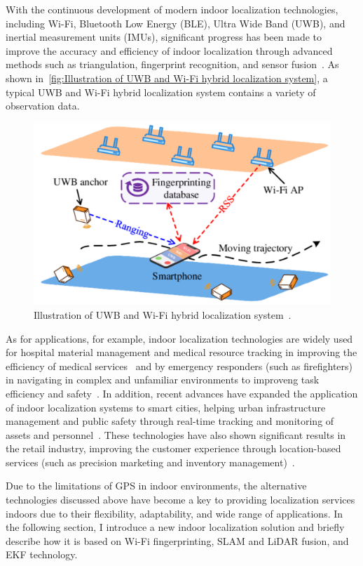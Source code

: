 \documentclass[12pt,a4paper]{article}
\numberwithin{equation}{section}
\begin{document}
With the continuous development of modern indoor localization technologies,
including Wi-Fi, Bluetooth Low Energy (BLE), Ultra Wide Band (UWB), and inertial
measurement units (IMUs), significant progress has been made to improve the
accuracy and efficiency of indoor localization through advanced methods such as
triangulation, fingerprint recognition, and sensor
fusion~\cite{guo2019survey}. As shown in~\autoref{fig:Illustration of UWB and
  Wi-Fi hybrid localization system}, a typical UWB and Wi-Fi hybrid localization
system contains a variety of observation data.
\begin{figure}[H]
  \centering
  \includegraphics[width=0.8\linewidth]{images/intro.png}
  \caption{Illustration of UWB and Wi-Fi hybrid localization
    system~\cite{article}.}
  \label{fig:Illustration of UWB and Wi-Fi hybrid localization system}
\end{figure}

As for applications, for example, indoor localization technologies are widely
used for hospital material management and medical resource tracking in improving
the efficiency of medical services~\cite{HOSSAIN20151} and by emergency
responders (such as firefighters) in navigating in complex and unfamiliar
environments to improveng task efficiency and safety~\cite
{fischer2010location}. In addition, recent advances have expanded the
application of indoor localization systems to smart cities, helping urban
infrastructure management and public safety through real-time tracking and
monitoring of assets and personnel~\cite{zhang2020smartcity}. These technologies
have also shown significant results in the retail industry, improving the
customer experience through location-based services (such as precision marketing
and inventory management)~\cite{chen2019indoor}.

Due to the limitations of GPS in indoor environments, the alternative
technologies discussed above have become a key to providing localization
services indoors due to their flexibility, adaptability, and wide range of
applications. In the following section, I introduce a new indoor localization
solution and briefly describe how it is based on Wi-Fi fingerprinting, SLAM and
LiDAR fusion, and EKF technology.
\end{document}

